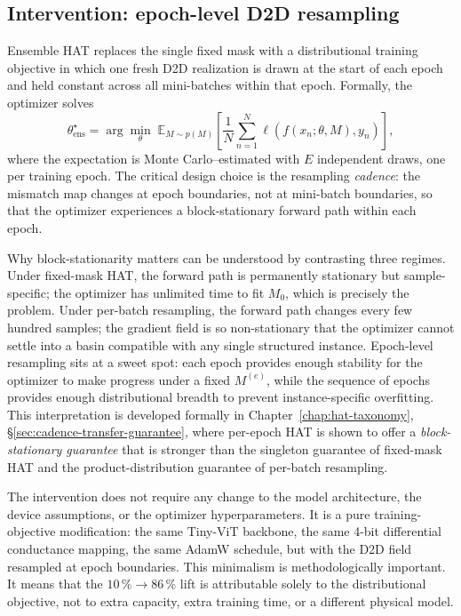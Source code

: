 \subsection{Intervention: epoch-level D2D resampling}

Ensemble HAT replaces the single fixed mask with a distributional training objective in which one fresh D2D realization is drawn at the start of each epoch and held constant across all mini-batches within that epoch. Formally, the optimizer solves
\begin{equation}
    \theta_{\mathrm{ens}}^{\star}=\arg\min_{\theta}\;\mathbb{E}_{M\sim p(M)}\!\left[\frac{1}{N}\sum_{n=1}^{N}\ell\!\left(f(x_{n};\theta,M),y_{n}\right)\right],
    \label{eq:ensemble-hat-repeat-c5}
\end{equation}
where the expectation is Monte Carlo--estimated with $E$ independent draws, one per training epoch. The critical design choice is the resampling \emph{cadence}: the mismatch map changes at epoch boundaries, not at mini-batch boundaries, so that the optimizer experiences a block-stationary forward path within each epoch.

Why block-stationarity matters can be understood by contrasting three regimes. Under fixed-mask HAT, the forward path is permanently stationary but sample-specific; the optimizer has unlimited time to fit $M_{0}$, which is precisely the problem. Under per-batch resampling, the forward path changes every few hundred samples; the gradient field is so non-stationary that the optimizer cannot settle into a basin compatible with any single structured instance. Epoch-level resampling sits at a sweet spot: each epoch provides enough stability for the optimizer to make progress under a fixed $M^{(e)}$, while the sequence of epochs provides enough distributional breadth to prevent instance-specific overfitting. This interpretation is developed formally in Chapter~\ref{chap:hat-taxonomy}, \S\ref{sec:cadence-transfer-guarantee}, where per-epoch HAT is shown to offer a \emph{block-stationary guarantee} that is stronger than the singleton guarantee of fixed-mask HAT and the product-distribution guarantee of per-batch resampling.

The intervention does not require any change to the model architecture, the device assumptions, or the optimizer hyperparameters. It is a pure training-objective modification: the same Tiny-ViT backbone, the same 4-bit differential conductance mapping, the same AdamW schedule, but with the D2D field resampled at epoch boundaries. This minimalism is methodologically important. It means that the $10\,\%\rightarrow86\,\%$ lift is attributable solely to the distributional objective, not to extra capacity, extra training time, or a different physical model.

